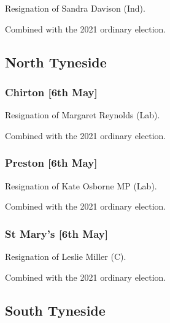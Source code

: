 \documentclass[a4paper,openany]{book}
\begin{document}
\begin{resultsiii}

Resignation of Sandra Davison (Ind).

Combined with the 2021 ordinary election.

\subsection*{North Tyneside}

\subsubsection*{Chirton \hspace*{\fill}\nolinebreak[1]%
	\enspace\hspace*{\fill}
	[6th May]}


Resignation of Margaret Reynolds (Lab).

Combined with the 2021 ordinary election.

\subsubsection*{Preston \hspace*{\fill}\nolinebreak[1]%
	\enspace\hspace*{\fill}
	[6th May]}


Resignation of Kate Osborne MP (Lab).

Combined with the 2021 ordinary election.

\subsubsection*{St Mary's \hspace*{\fill}\nolinebreak[1]%
	\enspace\hspace*{\fill}
	[6th May]}


Resignation of Leslie Miller (C).

Combined with the 2021 ordinary election.

\subsection*{South Tyneside}


\end{resultsiii}
\end{document}
